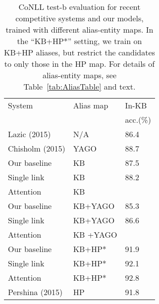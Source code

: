 


\begin{table}[ht!]
  \centering
  \begin{tabular}{l|l|l}
    System                 &  Alias map  & In-KB  \\
    & & acc.(\%)\\
    \hline
    Lazic (2015) & N/A          & 86.4 \\
    Chisholm (2015) & YAGO                   & 88.7 \\ 
    \hline
    Our baseline           & KB               &  87.5  \\
    Single link            & KB                   &  88.2 \\
    Attention              & KB                & \\
    \hline
     Our baseline           & KB+YAGO              &  85.3  \\
    Single link            & KB+YAGO                & 86.6 \\
    Attention              & KB +YAGO             & \\
    \hline
     Our baseline           & KB+HP*            &  91.9  \\
    Single link            & KB+HP*              & 92.1 \\
    Attention              & KB+HP*               & 92.8 \\
    \hline
   Pershina (2015) & HP  & 91.8
  \end{tabular}
\caption{CoNLL test-b evaluation for recent competitive systems and
  our models, trained with different alias-entity maps. In the ``KB+HP*'' setting, we train on KB+HP aliases, but restrict the candidates to only those in the HP map.  For details of
  alias-entity maps, see Table~\ref{tab:AliasTable} and text.}
 \label{table:conll_results} 
\end{table}

